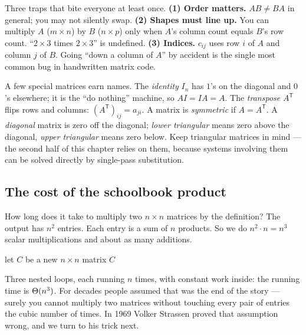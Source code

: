 \begin{trapbox}
Three traps that bite everyone at least once.
\textbf{(1) Order matters.} $AB\ne BA$ in general; you may not silently swap.
\textbf{(2) Shapes must line up.} You can multiply $A$ ($m\times n$) by $B$
($n\times p$) only when $A$'s column count equals $B$'s row count. ``$2\times 3$
times $2\times 3$'' is undefined.
\textbf{(3) Indices.} $c_{ij}$ uses row $i$ of $A$ and column $j$ of $B$. Going
``down a column of $A$'' by accident is the single most common bug in handwritten
matrix code.
\end{trapbox}

A few special matrices earn names. The \emph{identity} $I_n$ has $1$'s on the
diagonal and $0$'s elsewhere; it is the ``do nothing'' machine, so $AI=IA=A$. The
\emph{transpose} $A^{\mathsf T}$ flips rows and columns:
$(A^{\mathsf T})_{ij}=a_{ji}$. A matrix is \emph{symmetric} if $A=A^{\mathsf T}$.
A \emph{diagonal} matrix is zero off the diagonal; \emph{lower triangular} means
zero above the diagonal, \emph{upper triangular} means zero below. Keep
triangular matrices in mind --- the second half of this
chapter relies on them, because systems involving them can be solved directly by single-pass substitution.

\subsection{The cost of the schoolbook product}

How long does it take to multiply two $n\times n$ matrices by the definition? The
output has $n^2$ entries. Each entry is a sum of $n$ products. So we do
$n^2\cdot n=n^3$ scalar multiplications and about as many additions.

\begin{algorithm}[H]
\caption{\textsc{Square-Matrix-Multiply}$(A,B)$}
let $C$ be a new $n\times n$ matrix\;
\Return $C$\;
\end{algorithm}

Three nested loops, each running $n$ times, with constant work inside: the
running time is $\Theta(n^3)$. For decades people assumed that was the end of the
story --- surely you cannot multiply two matrices without touching every pair of
entries the cubic number of times. In 1969 Volker Strassen proved that
assumption wrong, and we turn to his trick next.

